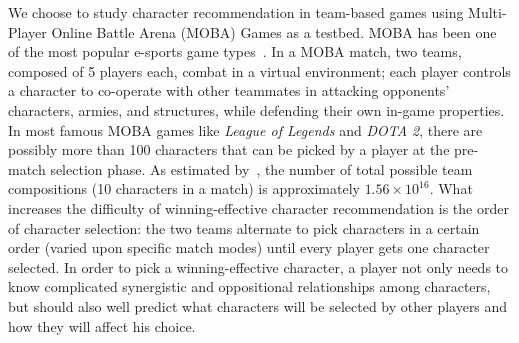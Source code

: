 We choose to study character recommendation in team-based games using Multi-Player Online Battle Arena (MOBA) Games as a testbed. MOBA has been one of the most popular e-sports game types~\cite{superdata2016}. In a MOBA match, two teams, composed of 5 players each, combat in a virtual environment; each player controls a character to co-operate with other teammates in attacking opponents' characters, armies, and structures, while defending their own in-game properties. In most famous MOBA games like \textit{League of Legends} and \textit{DOTA 2}, there are possibly more than 100 characters that can be picked by a player at the pre-match selection phase. As estimated by~\cite{hanke2017reco}, the number of total possible team compositions (10 characters in a match) is approximately $1.56 \times 10^{16}$. What increases the difficulty of winning-effective character recommendation is the order of character selection: the two teams alternate to pick characters in a certain order (varied upon specific match modes) until every player gets one character selected. In order to pick a winning-effective character, a player not only needs to know complicated synergistic and oppositional relationships among characters, but should also well predict what characters will be selected by other players and how they will affect his choice. 




